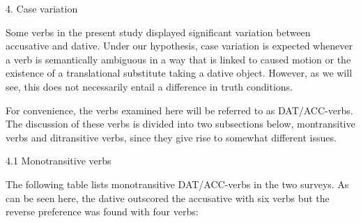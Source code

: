 \begin{stylelsSectioni}
4. Case variation 
\end{stylelsSectioni}

\begin{styleStandard}
Some verbs in the present study displayed significant variation between accusative and dative. Under our hypothesis, case variation is expected whenever a verb is semantically ambiguous in a way that is linked to caused motion or the existence of a translational substitute taking a dative object. However, as we will see, this does not necessarily entail a difference in truth conditions.
\end{styleStandard}

\begin{styleStandard}
For convenience, the verbs examined here will be referred to as DAT/ACC-verbs. The discussion of these verbs is divided into two subsections below, montransitive verbs and ditransitive verbs, since they give rise to somewhat different issues.
\end{styleStandard}

\begin{stylelsSectionii}
4.1 Monotransitive verbs
\end{stylelsSectionii}

\begin{styleStandard}
The following table lists monotransitive DAT/ACC-verbs in the two surveys. As can be seen here, the dative outscored the accusative with six verbs but the reverse preference was found with four verbs: 
\end{styleStandard}

